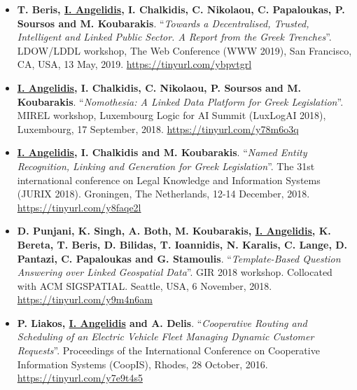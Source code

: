 \documentclass[a4paper,oneside,10pt]{article}
\begin{document}
\begin{itemize}

\item \textbf{T. Beris, \underline{I. Angelidis}, I. Chalkidis, C. Nikolaou, C. Papaloukas, P. Soursos and M. Koubarakis}. ``\textit{Towards a Decentralised, Trusted, Intelligent and Linked Public Sector. A Report from the Greek Trenches}''. LDOW/LDDL workshop, The Web Conference (WWW 2019), San Francisco, CA, USA, 13 May, 2019. \url{https://tinyurl.com/ybpvtgrl}

\item \textbf{\underline{I. Angelidis}, I. Chalkidis, C. Nikolaou, P. Soursos and M. Koubarakis}. ``\textit{Nomothesia: A Linked Data Platform for Greek Legislation}''. MIREL workshop, Luxembourg Logic for AI Summit (LuxLogAI 2018), Luxembourg, 17 September, 2018. \url{https://tinyurl.com/y78m6o3q}

\item \textbf{\underline{I. Angelidis}, I. Chalkidis and M. Koubarakis}. ``\textit{Named Entity Recognition, Linking and Generation for Greek Legislation}''. The 31st international conference on Legal Knowledge and Information Systems (JURIX 2018). Groningen, The Netherlands, 12-14 December‚ 2018. \url{https://tinyurl.com/y8faqe2l}

\item \textbf{D. Punjani, K. Singh, A. Both, M. Koubarakis, \underline{I. Angelidis}, K. Bereta, T. Beris, D. Bilidas, T. Ioannidis, N. Karalis, C. Lange, D. Pantazi, C. Papaloukas and G. Stamoulis}. ``\textit{Template-Based Question Answering over Linked Geospatial Data}''. GIR 2018 workshop. Collocated with ACM SIGSPATIAL. Seattle, USA, 6 November, 2018. \url{https://tinyurl.com/y9m4n6am}

\item \textbf{P. Liakos, \underline{I. Angelidis} and A. Delis}. ``\textit{Cooperative Routing and Scheduling of an Electric Vehicle Fleet Managing Dynamic Customer Requests}''. Proceedings of the International Conference on Cooperative Information Systems (CoopIS), Rhodes, 28 October, 2016. \url{https://tinyurl.com/y7e9t4s5}

\end{itemize}
\end{document}
